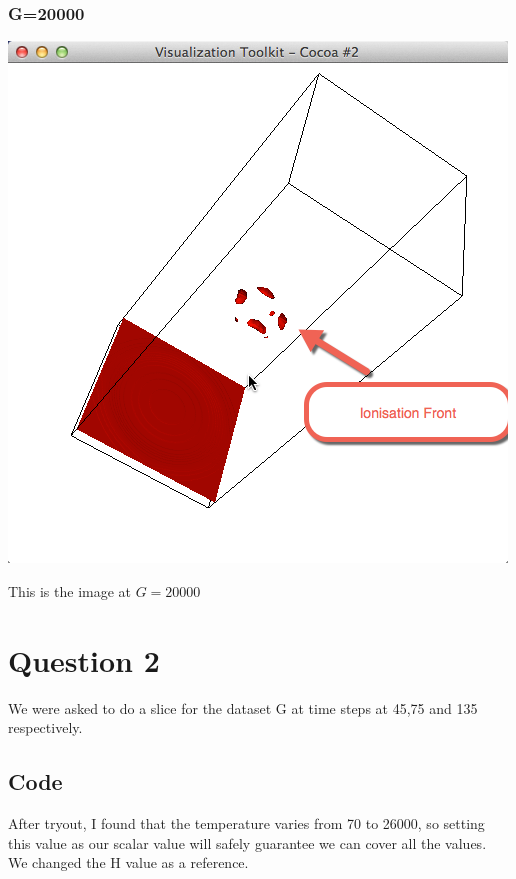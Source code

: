 \documentclass[11pt]{scrartcl}
\begin{document}
\subsubsection{G=20000}
\begin{minipage}[t]{\linewidth}
{
\includegraphics[scale = 0.7]{img_1_20000.png}

\centering
\medskip
{\footnotesize This is the image at $G = 20000$}
}
\end{minipage}

 
\section{Question 2}

We were asked to do a slice for the dataset G at time steps at 45,75 and 135 respectively. 
\subsection{Code}


After tryout, I found that the temperature varies from 70 to 26000, so setting this value as our scalar value will safely guarantee we can cover all the values.\\


We changed the H value as a reference.\\
\end{document}
